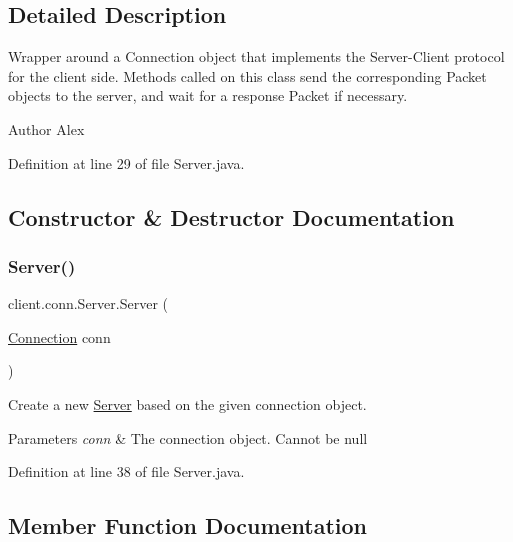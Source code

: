 \subsection{Detailed Description}
Wrapper around a Connection object that implements the Server-\/\+Client protocol for the client side. Methods called on this class send the corresponding {\ttfamily Packet} objects to the server, and wait for a response {\ttfamily Packet} if necessary. \begin{DoxyAuthor}{Author}
Alex 
\end{DoxyAuthor}


Definition at line 29 of file Server.\+java.



\subsection{Constructor \& Destructor Documentation}
\hypertarget{classclient_1_1conn_1_1_server_aea9f06e94bc3d3653c06b192ba097a14}{}\label{classclient_1_1conn_1_1_server_aea9f06e94bc3d3653c06b192ba097a14} 
\subsubsection{\texorpdfstring{Server()}{Server()}}
{\footnotesize\ttfamily client.\+conn.\+Server.\+Server (\begin{DoxyParamCaption}\item[{\hyperlink{classpt_1_1up_1_1fe_1_1lpro1613_1_1sharedlib_1_1conn_1_1_connection}{Connection}}]{conn }\end{DoxyParamCaption})}

Create a new \hyperlink{classclient_1_1conn_1_1_server}{Server} based on the given connection object. 
\begin{DoxyParams}{Parameters}
{\em conn} & The connection object. Cannot be null \\
\hline
\end{DoxyParams}


Definition at line 38 of file Server.\+java.



\subsection{Member Function Documentation}
\hypertarget{classclient_1_1conn_1_1_server_a28692c894a8055b95dd493fbaec8b567}{}\label{classclient_1_1conn_1_1_server_a28692c894a8055b95dd493fbaec8b567} 
